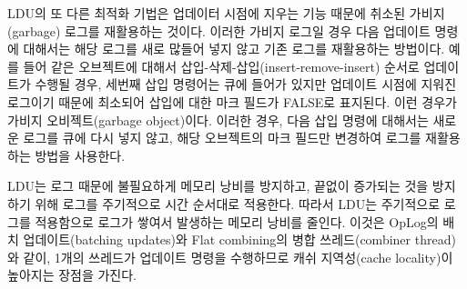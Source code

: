 LDU의 또 다른 최적화 기법은 업데이터 시점에 지우는 기능 때문에 취소된 가비지(garbage) 로그를
재활용하는 것이다.
이러한 가비지 로그일 경우 다음 업데이트 명령에 대해서는 해당 로그를 새로 많들어 넣지 않고 기존 로그를
재활용하는 방법이다.
예를 들어 같은 오브젝트에 대해서 삽입-삭제-삽입(insert-remove-insert) 순서로 업데이트가 수행될 경우, 세번째
삽입 명령어는 큐에 들어가 있지만 업데이트 시점에 지워진 로그이기 때문에 최소되어 삽입에 대한 마크 필드가
FALSE로 표지된다. 이런 경우가 가비지 오비젝트(garbage object)이다.
이러한 경우, 다음 삽입 명령에 대해서는 새로운 로그를 큐에 다시 넣지 않고, 해당 오브젝트의 마크 필드만
 변경하여 로그를 재활용하는 방법을 사용한다.

LDU는 로그 때문에 불필요하게 메모리 낭비를 방지하고, 끝없이 증가되는 것을 방지하기 위해 
로그를 주기적으로 시간 순서대로 적용한다. 
따라서 LDU는 주기적으로 로그를 적용함으로 로그가 쌓여서 발생하는 메모리 낭비를 줄인다. 
이것은 OpLog의 배치 업데이트(batching updates)와 Flat combining의 병합 쓰레드(combiner thread)와
같이, 1개의 쓰레드가 업데이트 명령을 수행하므로 캐쉬 지역성(cache locality)이 높아지는 장점을 가진다. 

